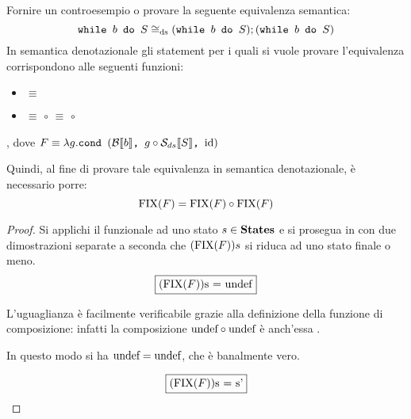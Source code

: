 {
  Fornire un controesempio o provare la seguente equivalenza semantica:
  $$
  \mbox{\normalfont{\texttt{while }}} b \textrm{\normalfont{\texttt{ do }}} S \cong_{\textrm{\normalfont{ds}}} (\mbox{\normalfont{\texttt{while }}} b \textrm{\normalfont{\texttt{ do }}} S);(\mbox{\normalfont{\texttt{while }}} b \textrm{\normalfont{\texttt{ do }}} S)
  $$
}
{}
In semantica denotazionale gli statement per i quali si vuole provare
l'equivalenza corrispondono alle seguenti funzioni:
\begin{itemize}
  \item {}
        $\equiv$
  \item {}
        $\equiv$
         $\circ$ 
        $\equiv$
         $\circ$ 
\end{itemize}
, dove $F \equiv{} \lambda{g}.\mbox{\normalfont{\texttt{cond }}} (\mathcal{B}{}\llbracket b \rrbracket \textrm{\normalfont{\texttt{, }}} g \circ \mathcal{S}_{ds}\llbracket S \rrbracket \textrm{\normalfont{\texttt{, }}} \textrm{\normalfont{id}})$

Quindi, al fine di provare tale equivalenza in semantica denotazionale, è
necessario porre:
\begin{equation}
\fixp{F} = \fixp{F} \circ \fixp{F}
\label{hw10-thesis}
\end{equation}

\begin{proof}

Si applichi il funzionale  ad uno stato $s\in\mbox{\textbf{States}}$ e si prosegua in
con due dimostrazioni separate a seconda che $(\textrm{\normalfont{FIX}}(F)) s$ si riduca ad uno
stato finale o meno.
$$
\boxed{(\textrm{\normalfont{FIX}}(F)) $s = \textrm{\normalfont{undef}}$}
$$

L'uguaglianza è facilmente verificabile grazie alla definizione della funzione
di composizione: infatti la composizione $\textrm{\normalfont{undef}} \circ \textrm{\normalfont{undef}}$ è anch'essa
\undefDS.

In questo modo si ha $\textrm{\normalfont{undef}} = \textrm{\normalfont{undef}}$, che è banalmente vero.

$$
\boxed{(\textrm{\normalfont{FIX}}(F)) $s = s'$}
$$

\end{proof}
